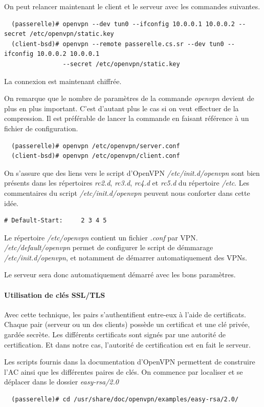 \documentclass[a4paper]{article}
\begin{document}
On peut relancer maintenant le client et le serveur avec les commandes suivantes.
\begin{verbatim}
  (passerelle)# openvpn --dev tun0 --ifconfig 10.0.0.1 10.0.0.2 --secret /etc/openvpn/static.key
  (client-bsd)# openvpn --remote passerelle.cs.sr --dev tun0 --ifconfig 10.0.0.2 10.0.0.1 
                --secret /etc/openvpn/static.key
\end{verbatim}

La connexion est maintenant chiffrée.

On remarque que le nombre de paramètres de la commande \textit{openvpn} devient
de plus en plus important. C'est d'autant plus le cas si on veut effectuer 
de la compression. 
Il est préférable de lancer la commande en faisant référence à un fichier de configuration.
\begin{verbatim}
  (passerelle)# openvpn /etc/openvpn/server.conf
  (client-bsd)# openvpn /etc/openvpn/client.conf
\end{verbatim}

On s'assure que des liens vers le script d'OpenVPN \textit{/etc/init.d/openvpn} 
sont bien présents dans les répertoires \textit{rc2.d}, \textit{rc3.d}, \textit{rc4.d} et
\textit{rc5.d} du répertoire \textit{/etc}.
Les commentaires du script \textit{/etc/init.d/openvpn} peuvent nous conforter dans
cette idée.
\begin{verbatim}
# Default-Start:     2 3 4 5
\end{verbatim}

Le répertoire \textit{/etc/openvpn} contient un fichier
\textit{.conf} par VPN. \textit{/etc/default/openvpn}
permet de configurer le script de démmarage \textit{/etc/init.d/openvpn},
et notamment de démarrer automatiquement des VPNs.

Le serveur sera donc automatiquement démarré avec les bons paramètres.

\paragraph{Utilisation de clés SSL/TLS}

Avec cette technique, les pairs s'authentifient entre-eux à l'aide de certificats.
Chaque pair (serveur ou un des clients) possède un certificat et une clé privée, gardée secrète.
Les différents certificats sont signés par une autorité de certification. Et dans notre cas,
l'autorité de certification est en fait le serveur.

Les scripts fournis dans la documentation d'OpenVPN permettent de construire l'AC ainsi
que les différentes paires de clés.
On commence par localiser et se déplacer dans le dossier \textit{easy-rsa/2.0}
\begin{verbatim}
  (passerelle)# cd /usr/share/doc/openvpn/examples/easy-rsa/2.0/
\end{verbatim}
\end{document}
